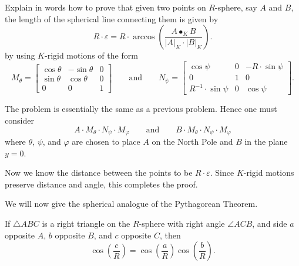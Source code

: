 \documentclass[newpage,hints,handout,noauthor,nooutcomes,12pt]{ximera}
\begin{document}
\begin{problem}
  Explain in words how to prove that given two points on $R$-sphere,
  say $A$ and $B$, the length of the spherical line connecting them
  is given by
  \[
  R\cdot \varepsilon = R\cdot\arccos\left(\frac{A\bullet_K B}{|A|_K\cdot |B|_K}\right).
  \]
  by using $K$-rigid motions of the form
  \[
   M_\theta=
  \begin{bmatrix}
    \cos\theta & -\sin\theta & 0\\
    \sin\theta & \cos\theta & 0\\
    0 & 0 & 1
  \end{bmatrix}
  \qquad\text{and}\qquad
  N_\psi=
  \begin{bmatrix}
    \cos\psi & 0 & -R\cdot\sin\psi\\
    0 & 1 & 0\\
    R^{-1}\cdot\sin\psi & 0 & \cos\psi
  \end{bmatrix}.
  \]
  \begin{freeResponse}
    The problem is essentially the same as a previous problem. Hence one must consider
    \[
    A\cdot M_\theta\cdot N_\psi\cdot M_\varphi \qquad\text{and}\qquad
    B\cdot M_\theta\cdot N_\psi\cdot M_\varphi
    \]
    where $\theta$, $\psi$, and $\varphi$ are chosen to place $A$ on
    the North Pole and $B$ in the plane $y=0$.

    Now we know the distance between the points to be $R\cdot
    \varepsilon$. Since $K$-rigid motions preserve distance and angle,
    this completes the proof.
  \end{freeResponse}
\end{problem}


We will now give the spherical analogue of the Pythagorean Theorem.

\begin{theorem}
  If $\triangle ABC$ is a right triangle on the $R$-sphere with right
  angle $\angle ACB$, and side $a$ opposite $A$, $b$ opposite $B$,
  and $c$ opposite $C$, then
  \[
  \cos\left(\frac{c}{R}\right)=\cos\left(\frac{a}{R}\right)\cos\left(\frac{b}{R}\right).
  \]
\end{theorem}
\end{document}
